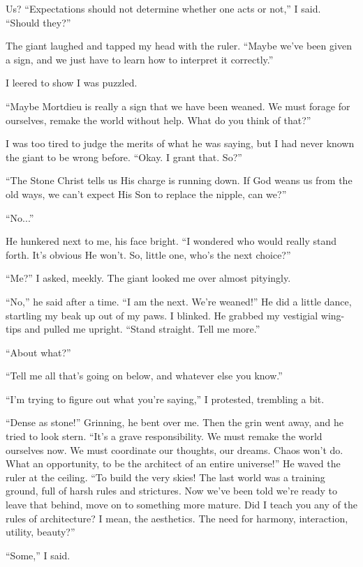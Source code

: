 Us? ``Expectations should not determine whether one acts or not,'' I said. ``Should they?''

The giant laughed and tapped my head with the ruler. ``Maybe we've been given a sign, and we just have to learn how to interpret it correctly.''

I leered to show I was puzzled.

``Maybe Mortdieu is really a sign that we have been weaned. We must forage for ourselves, remake the world without help. What do you think of that?''

I was too tired to judge the merits of what he was saying, but I had never known the giant to be wrong before. ``Okay. I grant that. So?''

``The Stone Christ tells us His charge is running down. If God weans us from the old ways, we can't expect His Son to replace the nipple, can we?''

``No...''

He hunkered next to me, his face bright. ``I wondered who would really stand forth. It's obvious He won't. So, little one, who's the next choice?''

``Me?'' I asked, meekly. The giant looked me over almost pityingly.

``No,'' he said after a time. ``I am the next. We're weaned!'' He did a little dance, startling my beak up out of my paws. I blinked. He grabbed my vestigial wing-tips and pulled me upright. ``Stand straight. Tell me more.''

``About what?''

``Tell me all that's going on below, and whatever else you know.''

``I'm trying to figure out what you're saying,'' I protested, trembling a bit.

``Dense as stone!'' Grinning, he bent over me. Then the grin went away, and he tried to look stern. ``It's a grave responsibility. We must remake the world ourselves now. We must coordinate our thoughts, our dreams. Chaos won't do. What an opportunity, to be the architect of an entire universe!'' He waved the ruler at the ceiling. ``To build the very skies! The last world was a training ground, full of harsh rules and strictures. Now we've been told we're ready to leave that behind, move on to something more mature. Did I teach you any of the rules of architecture? I mean, the aesthetics. The need for harmony, interaction, utility, beauty?''

``Some,'' I said.

